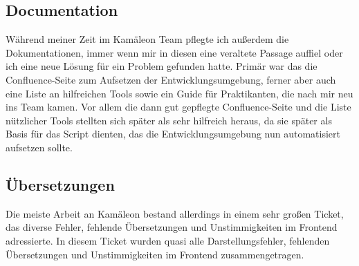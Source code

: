 \documentclass[11pt, a4paper, oneside]{scrartcl}
\begin{document}
        \subsection{Documentation}
        Während meiner Zeit im Kamäleon Team pflegte ich außerdem die Dokumentationen, immer wenn
        mir in diesen eine veraltete Passage auffiel oder ich eine neue Lösung für ein Problem
        gefunden hatte.
        Primär war das die Confluence-Seite zum Aufsetzen der Entwicklungsumgebung,
        ferner aber auch eine Liste an hilfreichen Tools sowie ein Guide für Praktikanten,
        die nach mir neu ins Team kamen.
        Vor allem die dann gut gepflegte Confluence-Seite und die Liste nützlicher Tools stellten
        sich später als sehr hilfreich heraus, da sie später als Basis für das Script dienten,
        das die Entwicklungsumgebung nun automatisiert aufsetzen sollte.

        \subsection{Übersetzungen}
        Die meiste Arbeit an Kamäleon bestand allerdings in einem sehr großen Ticket,
        das diverse Fehler, fehlende Übersetzungen und Unstimmigkeiten im Frontend adressierte.
        In diesem Ticket wurden quasi alle Darstellungsfehler, fehlenden Übersetzungen und
        Unstimmigkeiten im Frontend zusammengetragen.
\end{document}
